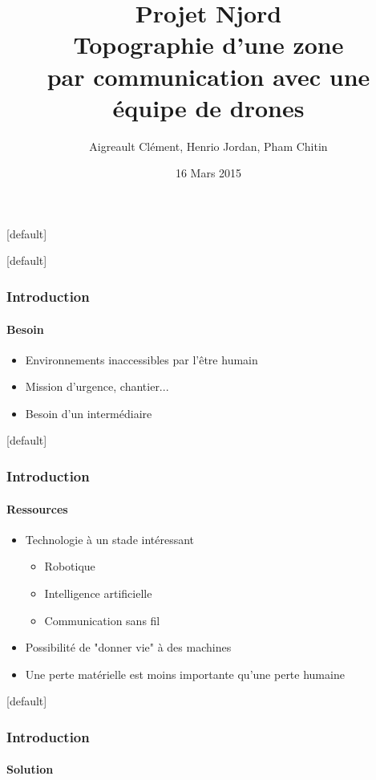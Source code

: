 \documentclass{beamer}
\title{\textbf{Projet Njord}\\ Topographie d'une zone \\ par communication avec une équipe de drones}
\author{Aigreault Clément, Henrio Jordan, Pham Chitin}
\date{16 Mars 2015}
\begin{document}
  {
    \makeatletter
    [default]
    \def\beamer@entrycode{\vspace*{-\headheight}}
    \makeatother
    \begin{frame}
      \titlepage
    \end{frame}
  }
  
  {
    \makeatletter
    [default]
    \def\beamer@entrycode{\vspace*{-\headheight}}
    \makeatother
    \begin{frame}
      \frametitle{Introduction}
      \framesubtitle{Besoin}
      
      \begin{itemize}
	\item Environnements inaccessibles par l'être humain
	\item Mission d'urgence, chantier...
	\item Besoin d'un intermédiaire
      \end{itemize}
    \end{frame}

    \makeatletter
    [default]
    \def\beamer@entrycode{\vspace*{-\headheight}}
    \makeatother
    \begin{frame}
      \frametitle{Introduction}
      \framesubtitle{Ressources}
      
      \begin{itemize}
	\item Technologie à un stade intéressant
	\begin{itemize}
	  \item Robotique
	  \item Intelligence artificielle
	  \item Communication sans fil
	\end{itemize}
	\item Possibilité de "donner vie" à des machines 
	\item Une perte matérielle est moins importante qu'une perte humaine
      \end{itemize}
    \end{frame}
    
    \makeatletter
    [default]
    \def\beamer@entrycode{\vspace*{-\headheight}}
    \makeatother
    \begin{frame}
      \frametitle{Introduction}
      \framesubtitle{Solution}
      

\end{frame}}
\end{document}
